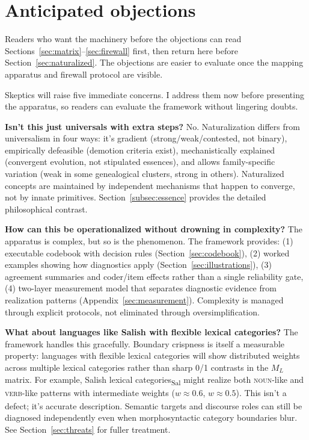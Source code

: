 \documentclass[12pt]{article}
\begin{document}
\section{Anticipated objections}\label{sec:objections}

Readers who want the machinery before the objections can read Sections~\ref{sec:matrix}--\ref{sec:firewall} first, then return here before Section~\ref{sec:naturalized}. The objections are easier to evaluate once the mapping apparatus and firewall protocol are visible.

Skeptics will raise five immediate concerns. I address them now before presenting the apparatus, so readers can evaluate the framework without lingering doubts.

\textbf{Isn't this just universals with extra steps?} No. Naturalization differs from universalism in four ways: it's gradient (strong/weak/contested, not binary), empirically defeasible (demotion criteria exist), mechanistically explained (convergent evolution, not stipulated essences), and allows family-specific variation (weak in some genealogical clusters, strong in others). Naturalized concepts are maintained by independent mechanisms that happen to converge, not by innate primitives. Section~\ref{subsec:essence} provides the detailed philosophical contrast.

\textbf{How can this be operationalized without drowning in complexity?} The apparatus is complex, but so is the phenomenon. The framework provides: (1) executable codebook with decision rules (Section~\ref{sec:codebook}), (2) worked examples showing how diagnostics apply (Section~\ref{sec:illustrations}), (3) agreement summaries and coder/item effects rather than a single reliability gate, (4) two-layer measurement model that separates diagnostic evidence from realization patterns (Appendix~\ref{sec:measurement}). Complexity is managed through explicit protocols, not eliminated through oversimplification.

\textbf{What about languages like Salish with flexible lexical categories?} The framework handles this gracefully. Boundary crispness is itself a measurable property: languages with flexible lexical categories will show distributed weights across multiple lexical categories rather than sharp 0/1 contrasts in the $M_L$ matrix. For example, Salish lexical categories\textsubscript{Sal} might realize both \textsc{noun}\textsubscript{\Cross}-like and \textsc{verb}\textsubscript{\Cross}-like patterns with intermediate weights ($w \approx 0.6$, $w \approx 0.5$). This isn't a defect; it's accurate description. Semantic targets and discourse roles can still be diagnosed independently even when morphosyntactic category boundaries blur. See Section~\ref{sec:threats} for fuller treatment.
\end{document}

